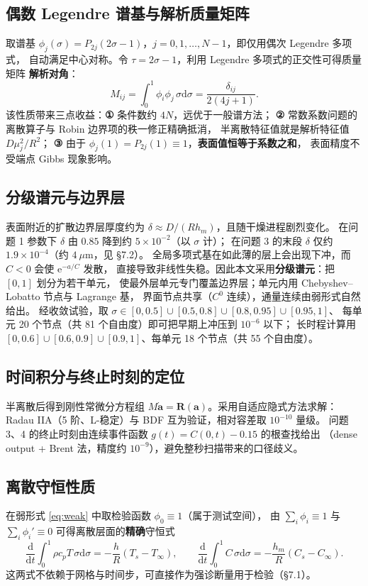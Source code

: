 \documentclass[12pt,a4paper]{ctexart}
\newcommand{\ud}{\mathrm{d}}
\newcommand{\dd}{\mathrm{d}}
\newcommand{\ee}{\mathrm{e}}
\begin{document}
\subsection{偶数 Legendre 谱基与解析质量矩阵}
取谱基 $\phi_j(\sigma)=P_{2j}(2\sigma-1)$，$j=0,1,\dots,N-1$，即仅用偶次 Legendre 多项式，
自动满足中心对称。令 $\tau=2\sigma-1$，利用 Legendre 多项式的正交性可得质量矩阵
\textbf{解析对角}：
\begin{equation}
M_{ij}=\int_0^1\!\phi_i\phi_j\,\sigma\ud\sigma
=\frac{\delta_{ij}}{2(4j+1)}.
\label{eq:mass}
\end{equation}
该性质带来三点收益：\textbf{①} 条件数约 $4N$，远优于一般谱方法；
\textbf{②} 常数系数问题的离散算子与 Robin 边界项的秩一修正精确抵消，
半离散特征值就是解析特征值 $D\mu_j^2/R^2$；
\textbf{③} 由于 $\phi_j(1)=P_{2j}(1)\equiv1$，\textbf{表面值恒等于系数之和}，
表面精度不受端点 Gibbs 现象影响。

\subsection{分级谱元与边界层}
表面附近的扩散边界层厚度约为 $\delta\approx D/(Rh_m)$，且随干燥进程剧烈变化。
在问题 1 参数下 $\delta$ 由 $0.85$ 降到约 $5\times10^{-2}$（以 $\sigma$ 计）；
在问题 3 的末段 $\delta$ 仅约 $1.9\times10^{-4}$（约 $4\ \mu$m，见 \S7.2）。
全局多项式基在如此薄的层上会出现下冲，而 $C<0$ 会使 $\ee^{-a/C}$ 发散，
直接导致非线性失稳。因此本文采用\textbf{分级谱元}：把 $[0,1]$ 划分为若干单元，
使最外层单元专门覆盖边界层；单元内用 Chebyshev--Lobatto 节点与 Lagrange 基，
界面节点共享（$C^0$ 连续），通量连续由弱形式自然给出。
经收敛试验，取 $\sigma\in[0,0.5]\cup[0.5,0.8]\cup[0.8,0.95]\cup[0.95,1]$、
每单元 20 个节点（共 81 个自由度）即可把早期上冲压到 $10^{-6}$ 以下；
长时程计算用 $[0,0.6]\cup[0.6,0.9]\cup[0.9,1]$、每单元 18 个节点（共 55 个自由度）。

\subsection{时间积分与终止时刻的定位}
半离散后得到刚性常微分方程组 $M\dot{\bm a}=\bm R(\bm a)$。采用自适应隐式方法求解：
Radau IIA（5 阶、L-稳定）与 BDF 互为验证，相对容差取 $10^{-10}$ 量级。
问题 3、4 的终止时刻由连续事件函数 $g(t)=C(0,t)-0.15$ 的根查找给出
（dense output + Brent 法，精度约 $10^{-9}$），避免整秒扫描带来的口径歧义。

\subsection{离散守恒性质}
在弱形式 \eqref{eq:weak} 中取检验函数 $\phi_0\equiv1$（属于测试空间），
由 $\sum_i\phi_i\equiv1$ 与 $\sum_i\phi_i'\equiv0$ 可得离散层面的\textbf{精确}守恒式
\begin{equation}
\frac{\dd}{\dd t}\int_0^1\!\rho c_pT\,\sigma\ud\sigma=-\frac{h}{R}(T_s-T_\infty),
\qquad
\frac{\dd}{\dd t}\int_0^1\! C\,\sigma\ud\sigma=-\frac{h_m}{R}(C_s-C_\infty).
\label{eq:cons}
\end{equation}
这两式不依赖于网格与时间步，可直接作为强诊断量用于检验（\S7.1）。
\end{document}
